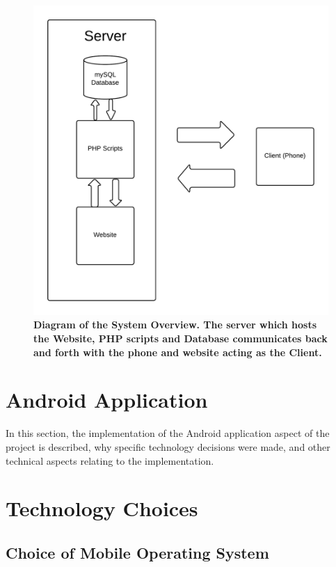 \documentclass{l4proj}
\begin{document}
\begin{figure}[h!]
\centering
\includegraphics[scale=0.1]{images/diagrams/systemoverview.png}
\caption{\textbf{Diagram of the System Overview. The server which hosts the Website, PHP scripts and Database communicates back and forth with the phone and website acting as the Client.}}
\label{impl:dia1}
\end{figure}

\section{Android Application}

In this section, the implementation of the Android application aspect of the project is described, why specific technology decisions were made, and other technical aspects relating to the implementation.

\section{Technology Choices}

\subsection{Choice of Mobile Operating System}
\end{document}
